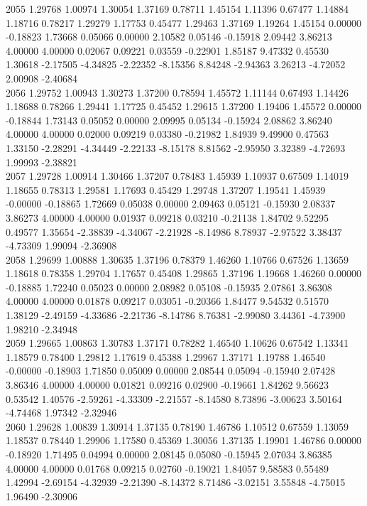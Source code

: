 {2055 1.29768 1.00974 1.30054 1.37169 0.78711 1.45154 1.11396 0.67477 1.14884 1.18716 0.78217 1.29279 1.17753 0.45477 1.29463 1.37169 1.19264 1.45154 0.00000 -0.18823 1.73668 0.05066 0.00000 2.10582 0.05146 -0.15918 2.09442 3.86213 4.00000 4.00000 0.02067 0.09221 0.03559 -0.22901 1.85187 9.47332 0.45530 1.30618 -2.17505 -4.34825 -2.22352 -8.15356 8.84248 -2.94363 3.26213 -4.72052 2.00908 -2.40684 \\
2056 1.29752 1.00943 1.30273 1.37200 0.78594 1.45572 1.11144 0.67493 1.14426 1.18688 0.78266 1.29441 1.17725 0.45452 1.29615 1.37200 1.19406 1.45572 0.00000 -0.18844 1.73143 0.05052 0.00000 2.09995 0.05134 -0.15924 2.08862 3.86240 4.00000 4.00000 0.02000 0.09219 0.03380 -0.21982 1.84939 9.49900 0.47563 1.33150 -2.28291 -4.34449 -2.22133 -8.15178 8.81562 -2.95950 3.32389 -4.72693 1.99993 -2.38821 \\
2057 1.29728 1.00914 1.30466 1.37207 0.78483 1.45939 1.10937 0.67509 1.14019 1.18655 0.78313 1.29581 1.17693 0.45429 1.29748 1.37207 1.19541 1.45939 -0.00000 -0.18865 1.72669 0.05038 0.00000 2.09463 0.05121 -0.15930 2.08337 3.86273 4.00000 4.00000 0.01937 0.09218 0.03210 -0.21138 1.84702 9.52295 0.49577 1.35654 -2.38839 -4.34067 -2.21928 -8.14986 8.78937 -2.97522 3.38437 -4.73309 1.99094 -2.36908 \\
2058 1.29699 1.00888 1.30635 1.37196 0.78379 1.46260 1.10766 0.67526 1.13659 1.18618 0.78358 1.29704 1.17657 0.45408 1.29865 1.37196 1.19668 1.46260 0.00000 -0.18885 1.72240 0.05023 0.00000 2.08982 0.05108 -0.15935 2.07861 3.86308 4.00000 4.00000 0.01878 0.09217 0.03051 -0.20366 1.84477 9.54532 0.51570 1.38129 -2.49159 -4.33686 -2.21736 -8.14786 8.76381 -2.99080 3.44361 -4.73900 1.98210 -2.34948 \\
2059 1.29665 1.00863 1.30783 1.37171 0.78282 1.46540 1.10626 0.67542 1.13341 1.18579 0.78400 1.29812 1.17619 0.45388 1.29967 1.37171 1.19788 1.46540 -0.00000 -0.18903 1.71850 0.05009 0.00000 2.08544 0.05094 -0.15940 2.07428 3.86346 4.00000 4.00000 0.01821 0.09216 0.02900 -0.19661 1.84262 9.56623 0.53542 1.40576 -2.59261 -4.33309 -2.21557 -8.14580 8.73896 -3.00623 3.50164 -4.74468 1.97342 -2.32946 \\
2060 1.29628 1.00839 1.30914 1.37135 0.78190 1.46786 1.10512 0.67559 1.13059 1.18537 0.78440 1.29906 1.17580 0.45369 1.30056 1.37135 1.19901 1.46786 0.00000 -0.18920 1.71495 0.04994 0.00000 2.08145 0.05080 -0.15945 2.07034 3.86385 4.00000 4.00000 0.01768 0.09215 0.02760 -0.19021 1.84057 9.58583 0.55489 1.42994 -2.69154 -4.32939 -2.21390 -8.14372 8.71486 -3.02151 3.55848 -4.75015 1.96490 -2.30906 \\
}
